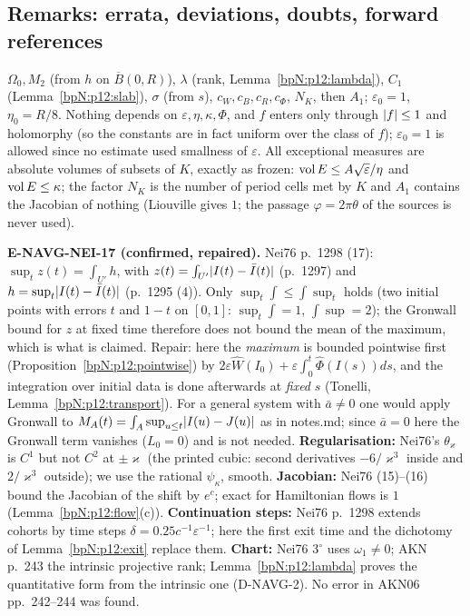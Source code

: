 \subsection{Remarks: errata, deviations, doubts, forward references}\label{bpN:p12:s-rem}

\begin{remark}\label{bpN:p12:constants}
$\Omega_0,M_2$ (from $h$ on $\overline B(0,R)$), $\lambda$ (rank, Lemma~\ref{bpN:p12:lambda}), $C_1$ (Lemma~\ref{bpN:p12:slab}), $\sigma$ (from $s$), $c_W,c_B,c_R,c_\Phi$, $N_K$, then $A_1$; $\varepsilon_0=1$, $\eta_0=R/8$. Nothing depends on $\varepsilon,\eta,\kappa,\Phi$, and $f$ enters only through $\lvert f\rvert\le1$ and holomorphy (so the constants are in fact uniform over the class of $f$); $\varepsilon_0=1$ is allowed since no estimate used smallness of $\varepsilon$. All exceptional measures are absolute volumes of subsets of $K$, exactly as frozen: $\operatorname{vol} E\le A\sqrt\varepsilon/\eta$ and $\operatorname{vol} E\le\kappa$; the factor $N_K$ is the number of period cells met by $K$ and $A_1$ contains the Jacobian of nothing (Liouville gives $1$; the passage $\varphi=2\pi\theta$ of the sources is never used).
\end{remark}

\begin{remark}\label{bpN:p12:errata}
\textbf{E-NAVG-NEI-17 (confirmed, repaired).} Nei76 p.~1298 (17): $\sup_tz(t)=\int_{U'}h$, with $z(t)=\int_{U'}\lvert I(t)-\bar I(t)\rvert$ (p.~1297) and $h=\sup_{t}\lvert I(t)-\bar I(t)\rvert$ (p.~1295 (4)). Only $\sup_t\int\le\int\sup_t$ holds (two initial points with errors $t$ and $1-t$ on $[0,1]$: $\sup_t\int=1$, $\int\sup=2$); the Gronwall bound for $z$ at fixed time therefore does not bound the mean of the maximum, which is what is claimed. Repair: here the \emph{maximum} is bounded pointwise first (Proposition~\ref{bpN:p12:pointwise}) by $2\varepsilon\widehat W(I_0)+\varepsilon\int_0^t\widehat\Phi(I(s))ds$, and the integration over initial data is done afterwards at \emph{fixed} $s$ (Tonelli, Lemma~\ref{bpN:p12:transport}). For a general system with $\bar a\ne0$ one would apply Gronwall to $M_A(t)=\int_A\sup_{u\le t}\lvert I(u)-J(u)\rvert$ as in notes.md; since $\bar a=0$ here the Gronwall term vanishes ($L_0=0$) and is not needed. \textbf{Regularisation:} Nei76's $\theta_\varkappa$ is $C^1$ but not $C^2$ at $\pm\varkappa$ (the printed cubic: second derivatives $-6/\varkappa^3$ inside and $2/\varkappa^3$ outside); we use the rational $\psi_\kappa$, smooth. \textbf{Jacobian:} Nei76 (15)--(16) bound the Jacobian of the shift by $e^{c}$; exact for Hamiltonian flows is $1$ (Lemma~\ref{bpN:p12:flow}(c)). \textbf{Continuation steps:} Nei76 p.~1298 extends cohorts by time steps $\delta=0.25c^{-1}\varepsilon^{-1}$; here the first exit time and the dichotomy of Lemma~\ref{bpN:p12:exit} replace them. \textbf{Chart:} Nei76 3$^\circ$ uses $\omega_1\ne0$; AKN p.~243 the intrinsic projective rank; Lemma~\ref{bpN:p12:lambda} proves the quantitative form from the intrinsic one (D-NAVG-2).
No error in AKN06 pp.~242--244 was found.
\end{remark}

